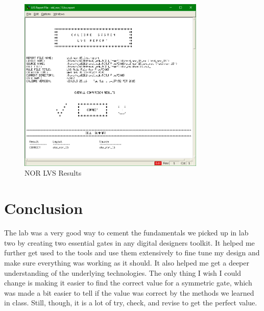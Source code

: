 \documentclass[12pt]{article}
\begin{document}
\begin{figure}[!htb]
  \centering
  \includegraphics[width=3.5in]{figures/nor/nor_lvs.png}
  \caption{NOR LVS Results}\label{fig:nor_lvs}
\end{figure}
\clearpage
\section{Conclusion}
The lab was a very good way to cement the fundamentals we picked up in lab two by creating two essential gates in any digital designers toolkit.
It helped me further get used to the tools and use them extensively to fine tune my design and make sure everything was working as it should. 
It also helped me get a deeper understanding of the underlying technologies. The only thing I wish I could change is making it easier to find the correct value for a symmetric gate,
which was made a bit easier to tell if the value was correct by the methods we learned in class. Still, though, it is a lot of try, check, and revise to get the perfect value.
\end{document}
